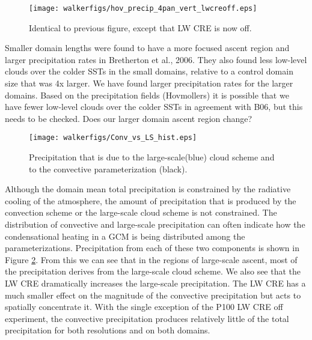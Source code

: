 \documentclass[11pt]{article}   	%
\begin{document}
\begin{figure}
  \texttt{[image: walkerfigs/hov\_precip\_4pan\_vert\_lwcreoff.eps]}
  \caption{Identical to previous figure, except that LW CRE is now off.}
  \label{fig:domdep_lwoff}
\end{figure}

Smaller domain lengths were found to have a more focused ascent region and larger precipitation rates in Bretherton et al., 2006.
They also found less low-level clouds over the colder SSTs in the small domains, relative to a control domain size that was 4x
larger.   We have found larger precipitation rates for the larger domains.  Based on the precipitation fields (Hovmollers) it is 
possible that we have fewer low-level clouds over the colder SSTs in agreement with B06, but this needs to be checked.   Does our larger domain ascent region change?  

\begin{figure}
  \centering
      \texttt{[image: walkerfigs/Conv\_vs\_LS\_hist.eps]}
  \caption{Precipitation that is due to the large-scale(blue) cloud scheme and to the convective parameterization (black).}
  \label{fig:conv_vs_ls}
\end{figure}

Although the domain mean total precipitation is constrained by the radiative cooling of the atmosphere, the amount of 
precipitation that is produced by the convection scheme or the large-scale cloud scheme is not constrained. 
The distribution of convective and large-scale precipitation can often indicate how the condensational heating
in a GCM is being distributed among the parameterizations.  Precipitation from each of these two components is
shown in Figure \ref{fig:conv_vs_ls}.  From this we can see that in the regions of large-scale ascent, most of the 
precipitation derives from the large-scale cloud scheme.  We also see that the LW CRE dramatically increases
the large-scale precipitation.  The LW CRE has a much smaller effect on the magnitude of the convective precipitation 
but acts to spatially concentrate it.  With the single exception 
of the P100 LW CRE off experiment, the convective precipitation produces relatively little of the total precipitation for 
both resolutions and on both domains.  
\end{document}
